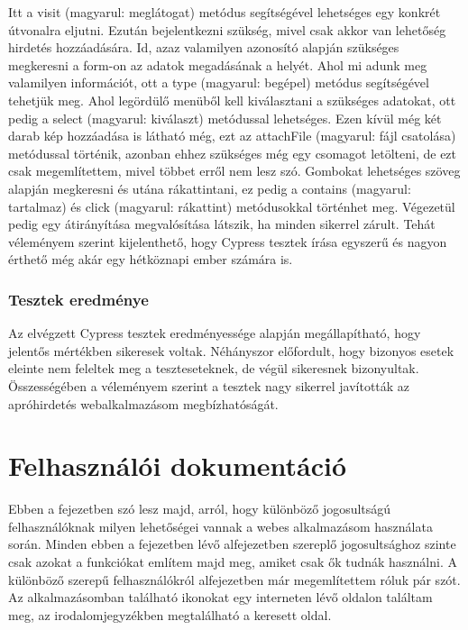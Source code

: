 \documentclass[]{thesis-ekf}
\theoremstyle{definition}
\theoremstyle{remark}
\begin{document}
		
		
		Itt a visit (magyarul: meglátogat) metódus segítségével lehetséges egy konkrét útvonalra eljutni. Ezután bejelentkezni szükség, mivel csak akkor van lehetőség hirdetés hozzáadására. Id, azaz valamilyen azonosító alapján szükséges megkeresni a form-on az adatok megadásának a helyét. Ahol mi adunk meg valamilyen információt, ott a type (magyarul: begépel) metódus segítségével tehetjük meg. Ahol legördülő menüből kell kiválasztani a szükséges adatokat, ott pedig a select (magyarul: kiválaszt) metódussal lehetséges. Ezen kívül még két darab kép hozzáadása is látható még, ezt az attachFile (magyarul: fájl csatolása) metódussal történik, azonban ehhez szükséges még egy csomagot letölteni, de ezt csak megemlítettem, mivel többet erről nem lesz szó. Gombokat lehetséges szöveg alapján megkeresni és utána rákattintani, ez pedig a contains (magyarul: tartalmaz) és click (magyarul: rákattint) metódusokkal történhet meg. Végezetül pedig egy átirányítása megvalósítása látszik, ha minden sikerrel zárult. Tehát véleményem szerint kijelenthető, hogy Cypress tesztek írása egyszerű és nagyon érthető még akár egy hétköznapi ember számára is.
		
	\subsection{Tesztek eredménye}
		Az elvégzett Cypress tesztek eredményessége alapján megállapítható, hogy jelentős mértékben sikeresek voltak. Néhányszor előfordult, hogy bizonyos esetek eleinte nem feleltek meg a teszteseteknek, de végül sikeresnek bizonyultak. Összességében a véleményem szerint a tesztek nagy sikerrel javították az apróhirdetés webalkalmazásom megbízhatóságát.   
		
	\chapter{Felhasználói dokumentáció}\label{ch-felhasznaloi}
		Ebben a fejezetben szó lesz majd, arról, hogy különböző jogosultságú felhasználóknak milyen lehetőségei vannak a webes alkalmazásom használata során. Minden ebben a fejezetben lévő alfejezetben szereplő jogosultsághoz szinte csak azokat a funkciókat említem majd meg, amiket csak ők tudnák használni. A különböző szerepű felhasználókról \az{\ref{sc-plantuml}} alfejezetben már megemlítettem róluk pár szót. Az alkalmazásomban található ikonokat egy interneten lévő oldalon találtam meg, az irodalomjegyzékben megtalálható a keresett oldal.\cite{Ikon} 
\end{document}
